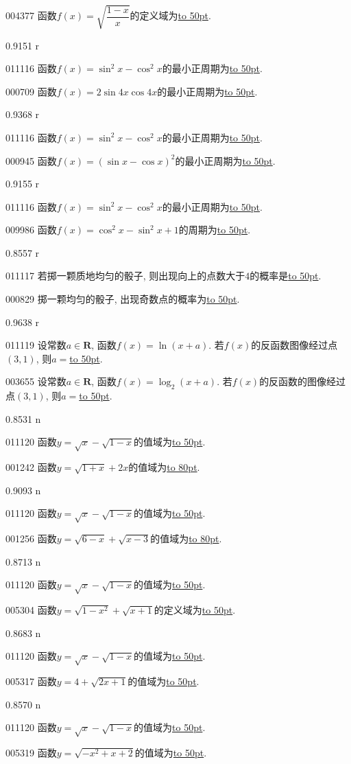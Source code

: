 \documentclass[10pt,a4paper]{article}
\newcommand{\blank}[1]{\underline{\hbox to #1pt{}}}
\begin{document}
004377	函数$f(x)=\sqrt{\dfrac{1-x}x}$的定义域为\blank{50}.

0.9151 r

011116	函数$f(x)=\sin^2 x-\cos^2 x$的最小正周期为\blank{50}.

000709	函数$f(x)=2\sin 4x \cos 4x$的最小正周期为\blank{50}.

0.9368 r

011116	函数$f(x)=\sin^2 x-\cos^2 x$的最小正周期为\blank{50}.

000945	函数$f(x)=(\sin x-\cos x)^2$的最小正周期为\blank{50}.

0.9155 r

011116	函数$f(x)=\sin^2 x-\cos^2 x$的最小正周期为\blank{50}.

009986	函数$f(x)=\cos^2 x-\sin ^2 x+1$的周期为\blank{50}.

0.8557 r

011117	若掷一颗质地均匀的骰子, 则出现向上的点数大于$4$的概率是\blank{50}.

000829	掷一颗均匀的骰子, 出现奇数点的概率为\blank{50}.

0.9638 r

011119	设常数$a\in \mathbf{R}$, 函数$f(x)=\ln (x+a)$. 若$f(x)$的反函数图像经过点$(3,1)$, 则$a=$\blank{50}.

003655	设常数$a\in \mathbf{R}$, 函数$f(x)=\log_2(x+a)$. 若$f(x)$的反函数的图像经过点$(3,1)$, 则$a=$\blank{50}.

0.8531 n

011120	函数$y=\sqrt{x}-\sqrt{1-x}$的值域为\blank{50}.

001242	函数$y=\sqrt{1+x}+2x$的值域为\blank{80}.

0.9093 n

011120	函数$y=\sqrt{x}-\sqrt{1-x}$的值域为\blank{50}.

001256	函数$y=\sqrt{6-x}+\sqrt{x-3}$的值域为\blank{80}.

0.8713 n

011120	函数$y=\sqrt{x}-\sqrt{1-x}$的值域为\blank{50}.

005304	函数$y=\sqrt {1-x^2}+\sqrt {x+1}$的定义域为\blank{50}.

0.8683 n

011120	函数$y=\sqrt{x}-\sqrt{1-x}$的值域为\blank{50}.

005317	函数$y=4+\sqrt {2x+1}$的值域为\blank{50}.

0.8570 n

011120	函数$y=\sqrt{x}-\sqrt{1-x}$的值域为\blank{50}.

005319	函数$y=\sqrt {-x^2+x+2}$的值域为\blank{50}.
\end{document}
